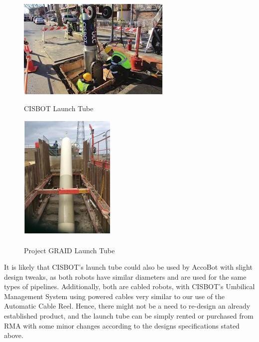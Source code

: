\documentclass[11pt]{article}		%
\newlength{\imageheight}	 %
\newcommand{\supercite}[1]{\textsuperscript{\cite{#1}}}		%
\begin{document}
		\begin{figure}[h]
				\centering
				\begin{multicols}{2}
				    \includegraphics[height = 0.8\imageheight]{CISBOTlaunchtube.jpg}
    				\caption{CISBOT Launch Tube \cite{CISBOT_project}}
    				\label{cisbotlaunchtube}
    				\columnbreak
    				\includegraphics[height = 0.8\imageheight]{GRAIDlaunchtube.jpg}
    				\caption{Project GRAID Launch Tube\supercite{GRAID}}
    				\label{graidlaunchtube}
				\end{multicols}
			\end{figure}
			\vspace{-0.5cm}
	It is likely that CISBOT’s launch tube could also be used by AccoBot with slight design tweaks, as both robots have similar diameters and are used for the same types of pipelines. Additionally, both are cabled robots, with CISBOT’s Umbilical Management System using powered cables very similar to our use of the Automatic Cable Reel. Hence, there might not be a  need to re-design an already established product, and the launch tube can be simply rented or purchased from RMA with some minor changes according to the designs specifications stated above. 
\end{document}
